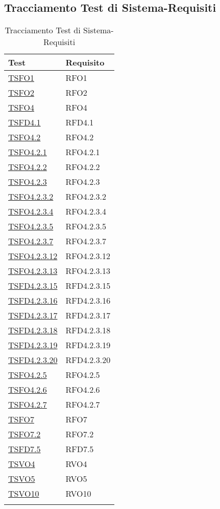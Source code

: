 \subsection{Tracciamento Test di Sistema-Requisiti}
\normalsize
\begin{longtable}{|>{\centering}m{5cm}|m{5cm}<{\centering}|}
\hline 
\textbf{Test} & \textbf{Requisito}\\
\hline
\endhead
\hyperlink{TSFO1}{TSFO1} & RFO1\\ \hline
\hyperlink{TSFO2}{TSFO2} & RFO2\\ \hline
\hyperlink{TSFO4}{TSFO4} & RFO4\\ \hline
\hyperlink{TSFD4.1}{TSFD4.1} & RFD4.1\\ \hline
\hyperlink{TSFO4.2}{TSFO4.2} & RFO4.2\\ \hline
\hyperlink{TSFO4.2.1}{TSFO4.2.1} & RFO4.2.1\\ \hline
\hyperlink{TSFO4.2.2}{TSFO4.2.2} & RFO4.2.2\\ \hline
\hyperlink{TSFO4.2.3}{TSFO4.2.3} & RFO4.2.3\\ \hline
\hyperlink{TSFO4.2.3.2}{TSFO4.2.3.2} & RFO4.2.3.2\\ \hline
\hyperlink{TSFO4.2.3.4}{TSFO4.2.3.4} & RFO4.2.3.4\\ \hline
\hyperlink{TSFO4.2.3.5}{TSFO4.2.3.5} & RFO4.2.3.5\\ \hline
\hyperlink{TSFO4.2.3.7}{TSFO4.2.3.7} & RFO4.2.3.7\\ \hline
\hyperlink{TSFO4.2.3.12}{TSFO4.2.3.12} & RFO4.2.3.12\\ \hline
\hyperlink{TSFO4.2.3.13}{TSFO4.2.3.13} & RFO4.2.3.13\\ \hline
\hyperlink{TSFD4.2.3.15}{TSFD4.2.3.15} & RFD4.2.3.15\\ \hline
\hyperlink{TSFD4.2.3.16}{TSFD4.2.3.16} & RFD4.2.3.16\\ \hline
\hyperlink{TSFD4.2.3.17}{TSFD4.2.3.17} & RFD4.2.3.17\\ \hline
\hyperlink{TSFD4.2.3.18}{TSFD4.2.3.18} & RFD4.2.3.18\\ \hline
\hyperlink{TSFD4.2.3.19}{TSFD4.2.3.19} & RFD4.2.3.19\\ \hline
\hyperlink{TSFD4.2.3.20}{TSFD4.2.3.20} & RFD4.2.3.20\\ \hline
\hyperlink{TSFO4.2.5}{TSFO4.2.5} & RFO4.2.5\\ \hline
\hyperlink{TSFO4.2.6}{TSFO4.2.6} & RFO4.2.6\\ \hline
\hyperlink{TSFO4.2.7}{TSFO4.2.7} & RFO4.2.7\\ \hline
\hyperlink{TSFO7}{TSFO7} & RFO7\\ \hline
\hyperlink{TSFO7.2}{TSFO7.2} & RFO7.2\\ \hline
\hyperlink{TSFD7.5}{TSFD7.5} & RFD7.5\\ \hline
\hyperlink{TSVO4}{TSVO4} & RVO4\\ \hline
\hyperlink{TSVO5}{TSVO5} & RVO5\\ \hline
\hyperlink{TSVO10}{TSVO10} & RVO10\\ \hline
\caption[Tracciamento Test di Sistema-Requisiti]{Tracciamento Test di Sistema-Requisiti}
\label{tabella:ts-requi}
\end{longtable}
\clearpage
